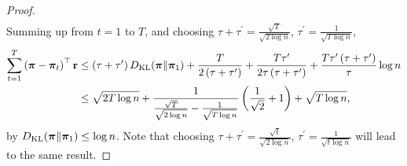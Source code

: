 \begin{proof}
\begin{equation*}
\begin{split}
\end{split}
\end{equation*}
Summing up from $t = 1$ to $T$, and choosing $\tau + \tau^\prime = \frac{\sqrt{T}}{\sqrt{2 \log{n}}}$, $\tau^\prime = \frac{1}{\sqrt{T \log{n}}}$,
\begin{equation*}
\begin{split}
    \sum\limits_{t=1}^{T}{\left( {\boldsymbol{\pi}} - {\boldsymbol{\pi}}_t \right)^\top {\mathbf{r}} } &\le \left(\tau + \tau^\prime\right) D_{\mathrm{KL}}{\left( {\boldsymbol{\pi}} \middle\| {\boldsymbol{\pi}}_1 \right)} + \frac{T}{2\left(\tau + \tau^\prime\right)} + \frac{T \tau^\prime}{2\tau \left(\tau + \tau^\prime\right)} + \frac{T \tau^\prime \left( \tau + \tau^\prime \right)}{\tau} \log{n} \\
    &\le \sqrt{2T \log{n}} + \frac{1}{\frac{\sqrt{T}}{\sqrt{2 \log{n}}} - \frac{1}{\sqrt{T\log{n}}}} \left( \frac{1}{\sqrt{2}} + 1 \right) + \sqrt{T \log{n}},
\end{split}
\end{equation*}
by $D_{\mathrm{KL}}{\left( {\boldsymbol{\pi}} \middle\| {\boldsymbol{\pi}}_1 \right)} \le \log{n}$. Note that choosing $\tau + \tau^\prime = \frac{\sqrt{t}}{\sqrt{2 \log{n}}}$, $\tau^\prime = \frac{1}{\sqrt{t \log{n}}}$ will lead to the same result.
\end{proof}


